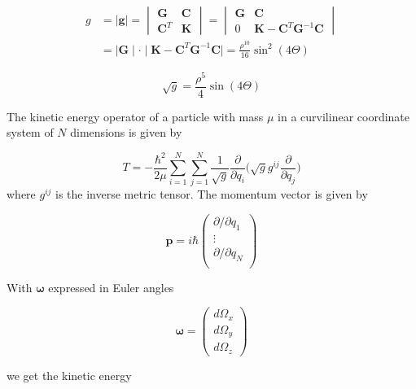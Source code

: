 \documentclass{article}
\begin{document}
\begin{align}
g &=
\mid\bm{g}\mid=
\begin{vmatrix}
\bm{G} & \bm{C}\\
\bm{C}^T & \bm{K}
\end{vmatrix}
=
\begin{vmatrix}
\bm{G} & \bm{C}\\
0 & \bm{K} - \bm{C}^T \bm{G}^{-1} \bm{C}
\end{vmatrix}\\
  &=
\mid \bm{G} \mid \cdot \mid\bm{K} - \bm{C}^T \bm{G}^{-1} \bm{C} \mid
=
\frac{\rho^{10}}{16}\sin^2(4\Theta)
\end{align}

\begin{equation}
	\sqrt{g}=\frac{\rho^5}{4}\sin(4\Theta)
\end{equation}

The kinetic energy operator of a particle with mass $\mu$ in a curvilinear coordinate system of $N$ dimensions is given by

\begin{equation}
	T = -\frac{\hbar^2}{2\mu} \sum_{i=1}^{N} \sum_{j=1}^{N} \frac{1}{\sqrt{g}} \frac{\partial}{\partial q_i} \Big(\sqrt{g} g^{ij} \frac{\partial}{\partial q_j}\Big)
\end{equation}
where $g^{ij}$ is the inverse metric tensor. The momentum vector is given by

\begin{equation}
	\bm{p} = i\hbar 
	\begin{pmatrix}
		\partial/\partial q_1\\
		\vdots\\
		\partial/\partial q_N\\
	\end{pmatrix}
\end{equation}

With $\bm{\omega}$ expressed in Euler angles 

\begin{equation}
\bm{\omega} = 
\begin{pmatrix}
	d\Omega_x\\
	d\Omega_y\\
	d\Omega_z
\end{pmatrix}
\end{equation}

we get the kinetic energy
\end{document}
